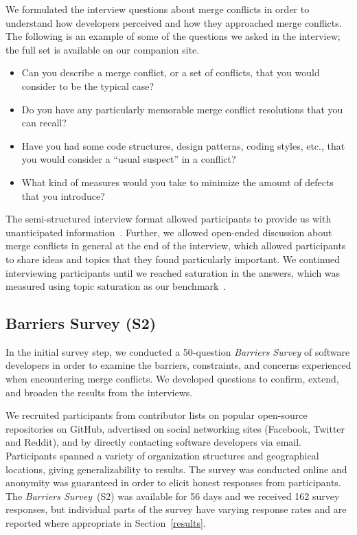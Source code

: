 We formulated the interview questions about merge conflicts in order to understand how developers perceived and how they approached merge conflicts.
The following is an example of some of the questions we asked in the interview; the full set is available on our companion site.
\begin{itemize}
	\item Can you describe a merge conflict, or a set of conflicts, that you would consider to be the typical case?
	\item Do you have any particularly memorable merge conflict resolutions that you can recall?
	\item Have you had some code structures, design patterns, coding styles, etc., that you would consider a ``usual suspect'' in a conflict?
	\item What kind of measures would you take to minimize the amount of defects that you introduce?
\end{itemize}

The semi-structured interview format allowed participants to provide us with unanticipated information~\cite{seaman2008qualitative}. 
Further, we allowed open-ended discussion about merge conflicts in general at the end of the interview, which allowed participants to share ideas and topics that they found particularly important. 
We continued interviewing participants until we reached saturation in the answers, which was measured using topic saturation as our benchmark~\cite{fusch2015we}.

\subsection{Barriers Survey (S2)}\label{perceptions_survey}

In the initial survey step, we conducted a 50-question \textit{Barriers Survey} of software developers in order to examine the barriers, constraints, and concerns experienced when encountering merge conflicts.
We developed questions to confirm, extend, and broaden the results from the interviews.

\renewcommand*{\thefootnote}{\arabic{footnote}}
We recruited participants from contributor lists on popular open-source repositories on GitHub, advertised on social networking sites (Facebook, Twitter and Reddit), and by directly contacting software developers via email. 
Participants spanned a variety of organization structures and geographical locations, giving generalizability to results.
The survey was conducted online and anonymity was guaranteed in order to elicit honest responses from participants.
The \textit{Barriers Survey}~(S2) was available for 56 days and we received 162 survey responses, but individual parts of the survey have varying response rates and are reported where appropriate in Section~\ref{results}.

